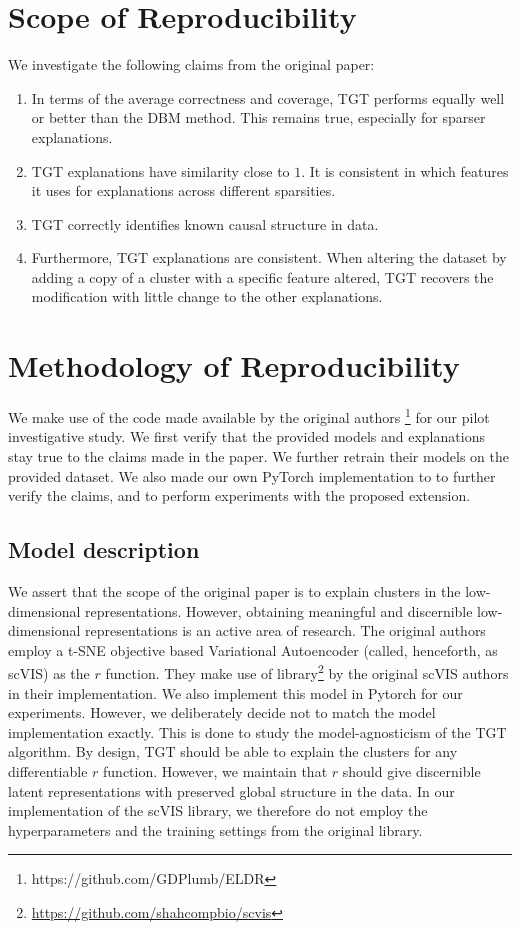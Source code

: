 \section{Scope of Reproducibility}
We investigate the following claims from the original paper:
\begin{enumerate}
    \item In terms of the average correctness and coverage, TGT performs equally well or better than the DBM method. This remains true, especially for sparser explanations.
    \item TGT explanations have similarity close to $1$. It is consistent in which features it uses for explanations across different sparsities.
    \item TGT correctly identifies known causal structure in data.
    \item Furthermore, TGT explanations are consistent. When altering the dataset by adding a copy of a cluster with a specific feature altered, TGT recovers the modification with little change to the other explanations.
\end{enumerate}


\section{Methodology of Reproducibility}

We make use of the code made available by the original authors \footnote{https://github.com/GDPlumb/ELDR} for our pilot investigative study. We first verify that the provided models and explanations stay true to the claims made in the paper. We further retrain their models on the provided dataset. We also made our own PyTorch \cite{paszke2019pytorch} implementation to to further verify the claims, and to perform experiments with the proposed extension.

\subsection{Model description}
We assert that the scope of the original paper is to explain clusters in the low-dimensional representations. However, obtaining meaningful and discernible low-dimensional representations is an active area of research. The original authors employ a t-SNE \cite{van2008visualizing} objective based Variational Autoencoder (called, henceforth, as scVIS) \cite{scvis} as the $r$ function. They make use of library\footnote{ \url{https://github.com/shahcompbio/scvis}} by the original scVIS authors in their implementation. We also implement this model in Pytorch for our experiments. However, we deliberately decide not to match the model implementation exactly. This is done to study the model-agnosticism of the TGT algorithm. By design, TGT should be able to explain the clusters for any differentiable $r$ function. However, we maintain that $r$ should give discernible latent representations with preserved global structure in the data. In our implementation of the scVIS library, we therefore do not employ the hyperparameters and the training settings from the original library. 

